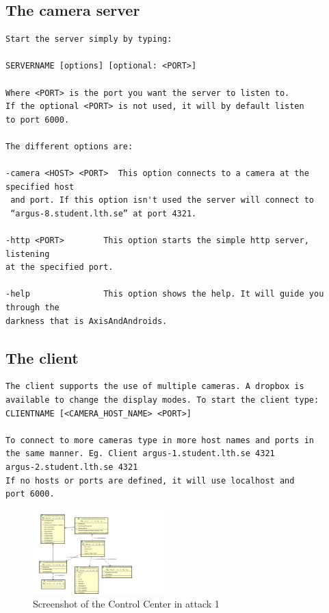 \documentclass[8pt,titlepage]{article}
\begin{document}
\subsection{The camera server}
\begin{verbatim}
Start the server simply by typing:

SERVERNAME [options] [optional: <PORT>]

Where <PORT> is the port you want the server to listen to. 
If the optional <PORT> is not used, it will by default listen 
to port 6000.

The different options are:

-camera <HOST> <PORT>  This option connects to a camera at the 
specified host
 and port. If this option isn't used the server will connect to 
 “argus-8.student.lth.se” at port 4321.

-http <PORT> 		This option starts the simple http server, listening 
at the specified port.

-help 				This option shows the help. It will guide you through the 
darkness that is AxisAndAndroids.
\end{verbatim}

\subsection{The client}
\begin{verbatim}
The client supports the use of multiple cameras. A dropbox is 
available to change the display modes. To start the client type:
CLIENTNAME [<CAMERA_HOST_NAME> <PORT>]

To connect to more cameras type in more host names and ports in 
the same manner. Eg. Client argus-1.student.lth.se 4321 
argus-2.student.lth.se 4321
If no hosts or ports are defined, it will use localhost and 
port 6000.
\end{verbatim}


\begin{figure}[hbp]
\includegraphics[width=0.45\textwidth]{../uml/desktop-client.png}
\caption{Screenshot of the Control Center in attack 1}
\end{figure}
\end{document}
